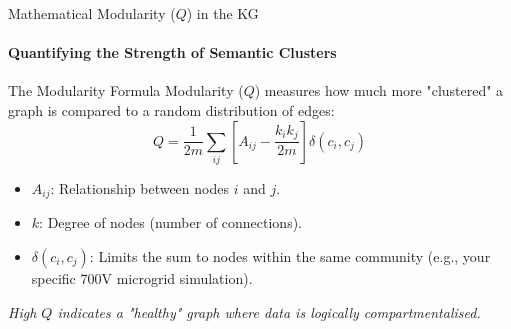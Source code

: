 \documentclass[aspectratio=169]{beamer}
\begin{document}
\begin{frame}{Mathematical Modularity ($Q$) in the KG}
    \framesubtitle{Quantifying the Strength of Semantic Clusters}
    
    \begin{block}{The Modularity Formula}
        Modularity ($Q$) measures how much more "clustered" a graph is compared to a random distribution of edges:
        \[ Q = \frac{1}{2m} \sum_{ij} \left[ A_{ij} - \frac{k_i k_j}{2m} \right] \delta(c_i, c_j) \]
    \end{block}

    \begin{itemize}
        \item \textbf{$A_{ij}$}: Relationship between nodes $i$ and $j$.
        \item \textbf{$k$}: Degree of nodes (number of connections).
        \item \textbf{$\delta(c_i, c_j)$}: Limits the sum to nodes within the same community (e.g., your specific 700V microgrid simulation).
    \end{itemize}
    \vfill
    \centering
    \textit{High $Q$ indicates a "healthy" graph where data is logically compartmentalised.}
\end{frame}
\end{document}
